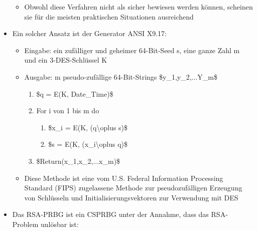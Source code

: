 \documentclass[a4paper]{article}
\begin{document}
\begin{multicols}{3}
\begin{itemize}
              \begin{itemize}
                  \item
                        Obwohl diese Verfahren nicht als sicher bewiesen werden können,
                        scheinen sie für die meisten praktischen Situationen ausreichend
              \end{itemize}
        \item
              Ein solcher Ansatz ist der Generator ANSI X9.17:

              \begin{itemize}
                  \item
                        Eingabe: ein zufälliger und geheimer 64-Bit-Seed s, eine ganze Zahl
                        m und ein 3-DES-Schlüssel K
                  \item
                        Ausgabe: m pseudo-zufällige 64-Bit-Strings \$y\_1,y\_2,...Y\_m\$

                        \begin{enumerate}
                            \def\labelenumi{\arabic{enumi}.}
                            \item
                                  \$q = E(K, Date\_Time)\$
                            \item
                                  For i von 1 bis m do

                                  \begin{enumerate}
                                      \def\labelenumii{\arabic{enumii}.}
                                      \item
                                            \$x\_i = E(K, (q\textbackslash oplus s)\$
                                      \item
                                            \$s = E(K, (x\_i\textbackslash oplus q)\$
                                  \end{enumerate}
                            \item
                                  \$Return(x\_1,x\_2,...x\_m)\$
                        \end{enumerate}
                  \item
                        Diese Methode ist eine vom U.S. Federal Information Processing
                        Standard (FIPS) zugelassene Methode zur pseudozufälligen Erzeugung
                        von Schlüsseln und Initialisierungsvektoren zur Verwendung mit DES
              \end{itemize}
        \item
              Das RSA-PRBG ist ein CSPRBG unter der Annahme, dass das RSA-Problem
              unlösbar ist:


\end{itemize}
\end{multicols}
\end{document}
